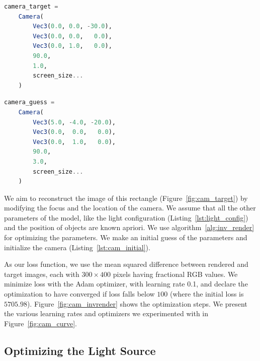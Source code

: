 \documentclass{juliacon}
\begin{document}
\noindent
\begin{minipage}{\linewidth}
\begin{lstlisting}[caption = {Camera Parameters to be Reconstructed},
                   label = {lst:cam_opt},
                   captionpos = b,
                   language = Julia]
camera_target =
    Camera(
        Vec3(0.0, 0.0, -30.0),
        Vec3(0.0, 0.0,   0.0),
        Vec3(0.0, 1.0,   0.0),
        90.0,
        1.0,
        screen_size...
    )
\end{lstlisting}
\end{minipage}

\noindent
\begin{minipage}{\linewidth}
\begin{lstlisting}[caption = {Initial Guess of the Camera Parameters},
                   label = {lst:cam_initial},
                   captionpos = b,
                   language = Julia]
camera_guess =
    Camera(
        Vec3(5.0, -4.0, -20.0),
        Vec3(0.0,  0.0,   0.0),
        Vec3(0.0,  1.0,   0.0),
        90.0,
        3.0,
        screen_size...
    )
\end{lstlisting}
\end{minipage}

We aim to reconstruct the image of this rectangle (Figure~\ref{fig:cam_target}) by modifying the focus and the location of the camera. We assume that all the other parameters of the model, like the light configuration (Listing~\ref{lst:light_config}) and the position of objects are known apriori. We use algorithm~\ref{alg:inv_render} for optimizing the parameters. We make an initial guess of the parameters and initialize the camera (Listing~\ref{lst:cam_initial}).

As our loss function, we use the mean squared difference between rendered and target images, each with $300\times400$ pixels having fractional RGB values. We minimize loss with the Adam optimizer, with learning rate 0.1, and declare the optimization to have converged if loss falls below $100$ (where the initial loss is $5705.98$). Figure~\ref{fig:cam_invrender} shows the optimization steps. We present the various learning rates and optimizers we experimented with in Figure~\ref{fig:cam_curve}.

\subsection{Optimizing the Light Source}
\label{sec:light_source}
\end{document}
